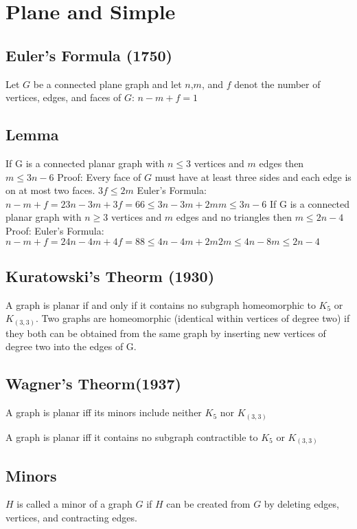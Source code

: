 \chapter{Plane and Simple}
\section{Euler's Formula (1750)}

Let $G$ be a connected plane graph and let $n$,$m$, and $f$ denot the number of vertices, edges, and faces of $G$: $n - m + f = 1$

\section{Lemma}

If G is a connected planar graph with $n \leq 3$ vertices and $m$ edges then $m \leq 3n-6$
Proof:
Every face of $G$ must have at least three sides and each edge is on at most two faces. 
	$3f \leq 2m$
Euler's Formula:
	$n - m + f = 2
	3n - 3m + 3f = 6
	6 \leq 3n - 3m + 2m
	m \leq 3n - 6$
If G is a connected planar graph with $n \geq 3$ vertices and $m$ edges and no triangles then $m \leq 2n - 4$
Proof:
Euler's Formula:
	$n - m + f =2 
	4n - 4m + 4f = 8
	8 \leq 4n - 4m + 2m 
	2m \leq 4n - 8 
	m \leq 2n - 4$

\section{Kuratowski's Theorm (1930)}

A graph is planar if and only if it contains no subgraph homeomorphic to $K_5$ or $K_(3,3)$.
Two graphs are homeomorphic (identical within vertices of degree two) if they both can be obtained from the same graph by inserting new vertices of degree two into the edges of G.

\section{Wagner's Theorm(1937)}

A graph is planar iff its minors include neither $K_5$ nor $K_(3,3)$

A graph is planar iff it contains no subgraph contractible to $K_5$ or $K_(3,3)$

\section{Minors}

$H$ is called a minor of a graph $G$ if $H$ can be created from $G$ by deleting edges, vertices, and contracting edges. 

